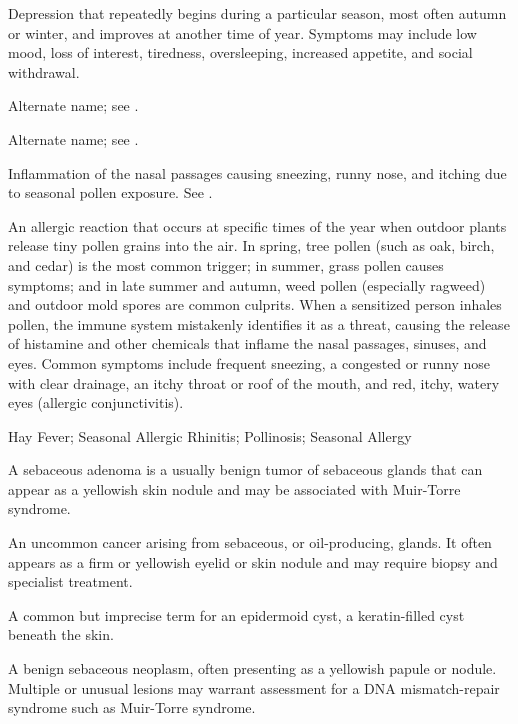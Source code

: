  Depression that repeatedly begins during a particular season, most often autumn or winter, and improves at another time of year. Symptoms may include low mood, loss of interest, tiredness, oversleeping, increased appetite, and social withdrawal.

 Alternate name; see .

 Alternate name; see .

 Inflammation of the nasal passages causing sneezing, runny nose, and itching due to seasonal pollen exposure. See .

 An allergic reaction that occurs at specific times of the year when outdoor plants release tiny pollen grains into the air. In spring, tree pollen (such as oak, birch, and cedar) is the most common trigger; in summer, grass pollen causes symptoms; and in late summer and autumn, weed pollen (especially ragweed) and outdoor mold spores are common culprits. When a sensitized person inhales pollen, the immune system mistakenly identifies it as a threat, causing the release of histamine and other chemicals that inflame the nasal passages, sinuses, and eyes. Common symptoms include frequent sneezing, a congested or runny nose with clear drainage, an itchy throat or roof of the mouth, and red, itchy, watery eyes (allergic conjunctivitis).

\synonyms
Hay Fever; Seasonal Allergic Rhinitis; Pollinosis; Seasonal Allergy

 A sebaceous adenoma is a usually benign tumor of sebaceous glands that can appear as a yellowish skin nodule and may be associated with Muir-Torre syndrome.

 An uncommon cancer arising from sebaceous, or oil-producing, glands. It often appears as a firm or yellowish eyelid or skin nodule and may require biopsy and specialist treatment.

 A common but imprecise term for an epidermoid cyst, a keratin-filled cyst beneath the skin.

 A benign sebaceous neoplasm, often presenting as a yellowish papule or nodule. Multiple or unusual lesions may warrant assessment for a DNA mismatch-repair syndrome such as Muir-Torre syndrome.

